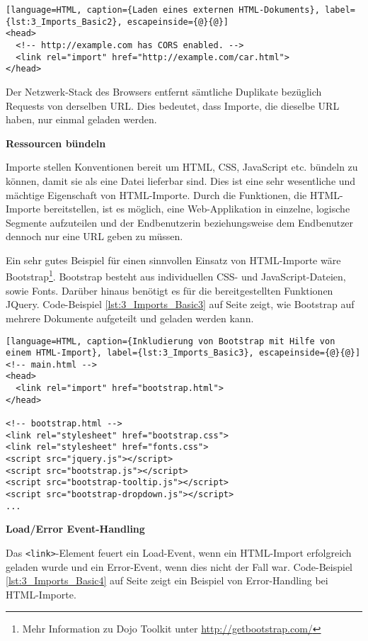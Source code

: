 \begin{lstlisting}[language=HTML, caption={Laden eines externen HTML-Dokuments}, label={lst:3_Imports_Basic2}, escapeinside={@}{@}]
<head>
  <!-- http://example.com has CORS enabled. -->
  <link rel="import" href="http://example.com/car.html">
</head>
\end{lstlisting}

Der Netzwerk-Stack des Browsers entfernt sämtliche Duplikate bezüglich Requests von derselben URL. Dies bedeutet, dass Importe, die dieselbe URL haben, nur einmal geladen werden.

\textbf{Ressourcen bündeln}

Importe stellen Konventionen bereit um HTML, CSS, JavaScript etc. bündeln zu können, damit sie als eine Datei lieferbar sind. Dies ist eine sehr wesentliche und mächtige Eigenschaft von HTML-Importe. Durch die Funktionen, die HTML-Importe bereitstellen, ist es möglich, eine Web-Applikation in einzelne, logische Segmente aufzuteilen und der Endbenutzerin beziehungsweise dem Endbenutzer dennoch nur eine URL geben zu müssen.

Ein sehr gutes Beispiel für einen sinnvollen Einsatz von HTML-Importe wäre Bootstrap\footnote{Mehr Information zu Dojo Toolkit unter \href{http://getbootstrap.com/}{http://getbootstrap.com/}}. Bootstrap besteht aus individuellen CSS- und JavaScript-Dateien, sowie Fonts. Darüber hinaus benötigt es für die bereitgestellten Funktionen JQuery. Code-Beispiel \ref{lst:3_Imports_Basic3} auf Seite \pageref{lst:3_Imports_Basic3} zeigt, wie Bootstrap auf mehrere Dokumente aufgeteilt und geladen werden kann.

\begin{lstlisting}[language=HTML, caption={Inkludierung von Bootstrap mit Hilfe von einem HTML-Import}, label={lst:3_Imports_Basic3}, escapeinside={@}{@}]
<!-- main.html -->
<head>
  <link rel="import" href="bootstrap.html">
</head>

<!-- bootstrap.html -->
<link rel="stylesheet" href="bootstrap.css">
<link rel="stylesheet" href="fonts.css">
<script src="jquery.js"></script>
<script src="bootstrap.js"></script>
<script src="bootstrap-tooltip.js"></script>
<script src="bootstrap-dropdown.js"></script>
...
\end{lstlisting}

\textbf{Load/Error Event-Handling}

Das \lstinline|<link>|-Element feuert ein \glqq Load\grqq -Event, wenn ein HTML-Import erfolgreich geladen wurde und ein \glqq Error\grqq -Event, wenn dies nicht der Fall war. Code-Beispiel \ref{lst:3_Imports_Basic4} auf Seite \pageref{lst:3_Imports_Basic4} zeigt ein Beispiel von Error-Handling bei HTML-Importe.

